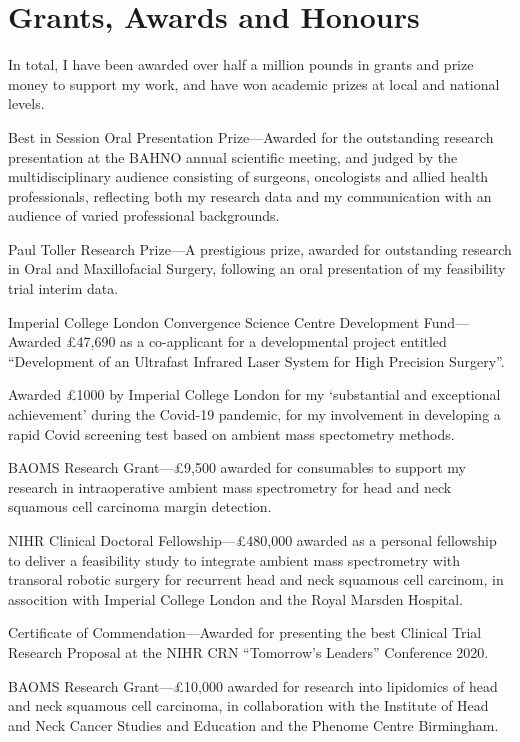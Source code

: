 \section*{Grants, Awards and Honours}

In total, I have been awarded over half a million pounds in grants and prize money to support my work, and have won academic prizes at local and national levels.

 Best in Session Oral Presentation Prize---Awarded for the outstanding research presentation at the BAHNO annual scientific meeting, and judged by the multidisciplinary audience consisting of surgeons, oncologists and allied health professionals, reflecting both my research data and my communication with an audience of varied professional backgrounds.

 Paul Toller Research Prize---A prestigious prize, awarded for outstanding research in Oral and Maxillofacial Surgery, following an oral presentation of my feasibility trial interim data.

 Imperial College London Convergence Science Centre Development Fund---Awarded \pounds47,690 as a co-applicant for a developmental project entitled ``Development of an Ultrafast Infrared Laser System for High Precision Surgery''.

 Awarded \pounds1000 by Imperial College London for my `substantial and exceptional achievement' during the Covid-19 pandemic, for my involvement in developing a rapid Covid screening test based on ambient mass spectometry methods.

 BAOMS Research Grant---\pounds9,500 awarded for consumables to support my research in intraoperative ambient mass spectrometry for head and neck squamous cell carcinoma margin detection.

 NIHR Clinical Doctoral Fellowship---\pounds480,000 awarded as a personal fellowship to deliver a feasibility study to integrate ambient mass spectrometry with transoral robotic surgery for recurrent head and neck squamous cell carcinom, in assocition with Imperial College London and the Royal Marsden Hospital.

 Certificate of Commendation---Awarded for presenting the best Clinical Trial Research Proposal at the NIHR CRN ``Tomorrow's Leaders'' Conference 2020.

 BAOMS Research Grant---\pounds10,000 awarded for research into lipidomics of head and neck squamous cell carcinoma, in collaboration with the Institute of Head and Neck Cancer Studies and Education and the Phenome Centre Birmingham.

